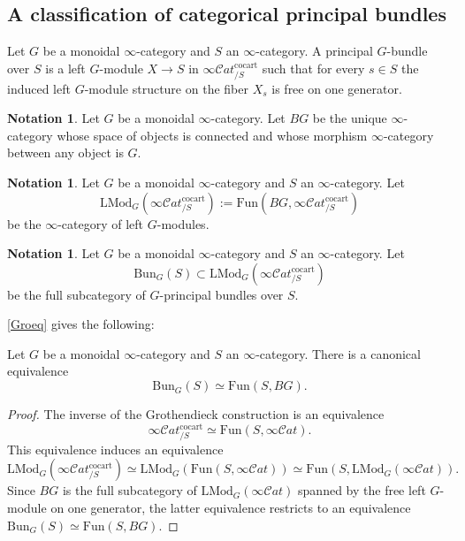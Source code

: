 \documentclass[10pt,oneside]{article}
\numberwithin{equation}{section} %
\numberwithin{figure}{section} %
\theoremstyle{plain}
\theoremstyle{definition}
\newtheorem{notation}[thm]{Notation}
\newcommand{\G}{{G}}
\newcommand{\rS}{{S}}
\newcommand{\LMod}{{\mathrm{LMod}}}
\newcommand{\Fun}{\mathrm{Fun}}
\newcommand{\cocart}{{\mathrm{cocart}}}
\newcommand{\scat}{\mathcal{C}\mathit{at}}
\begin{document}
\subsection{A classification of categorical principal bundles}

\begin{definition}

Let $G$ be a monoidal $\infty$-category and $S$ an $\infty$-category.
A principal $G$-bundle over $S$ is a left $G$-module $X \to S$ in $\infty\scat^\cocart_{/S}$ such that for every $s \in \rS$
the induced left $G$-module structure on the fiber $X_s$ is free on one generator. 

\end{definition}

\begin{notation}Let $G$ be a monoidal $\infty$-category.
Let $BG$ be the unique $\infty$-category whose space of objects is connected and whose morphism $\infty$-category between any object is $\G.$
    
\end{notation}

\begin{notation}

Let $G$ be a monoidal $\infty$-category and $S$ an $\infty$-category.
Let $$\LMod_G(\infty\scat^\cocart_{/S}):= \Fun(BG,\infty\scat^\cocart_{/S})$$ be the  $\infty$-category of left $G$-modules.
    
\end{notation}

\begin{notation}

Let $G$ be a monoidal $\infty$-category and $S$ an $\infty$-category.
Let $$\mathrm{Bun}_G(S) \subset \LMod_G(\infty\scat^\cocart_{/S})$$ be the full subcategory of $G$-principal bundles over $S$.
    
\end{notation}

\cref{Groeq} gives the following:

\begin{corollary}\label{grobun}
Let $G$ be a monoidal $\infty$-category and $S$ an $\infty$-category.
There is a canonical equivalence
$$\mathrm{Bun}_G(S) \simeq \Fun(S, BG). $$
    
\end{corollary}

\begin{proof}

The inverse of the Grothendieck construction is an equivalence
$$ \infty\scat^\cocart_{/S} \simeq \Fun(S, \infty\scat). $$
This equivalence induces an equivalence
$$ \LMod_G(\infty\scat^\cocart_{/S}) \simeq \LMod_G(\Fun(S, \infty\scat)) \simeq \Fun(S, \LMod_G(\infty\scat)). $$
Since $BG$ is the full subcategory of $\LMod_G(\infty\scat)$
spanned by the free left $G$-module on one generator, the latter equivalence restricts to an equivalence
$ \mathrm{Bun}_G(S) \simeq \Fun(S, BG). $
\end{proof}
\end{document}
